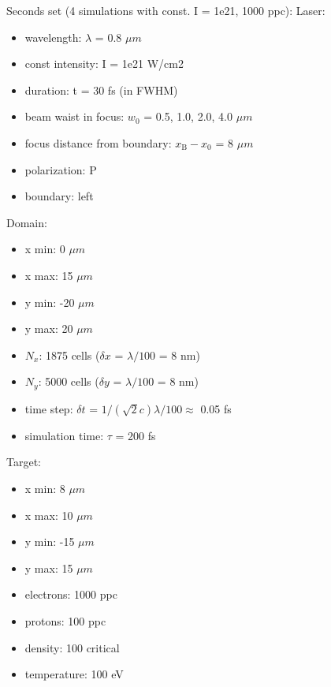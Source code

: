 \noindent
Seconds set (4 simulations with const. I = 1e21, 1000 ppc):
\noindent
Laser:
\begin{itemize}
	\item wavelength: $ \lambda $ = 0.8 $ \mu m $
	\item const intensity: I = 1e21 W/cm2
	\item duration: t = 30 fs (in FWHM)
	\item beam waist in focus: $ w_0 $ = 0.5, 1.0, 2.0, 4.0 $ \mu m $
	\item focus distance from boundary: $ x_\mathrm{B} - x_0 $ = 8 $ \mu m $
	\item polarization: P
	\item boundary: left 
\end{itemize}
Domain:
\begin{itemize}
	\item x min: 0 $ \mu m $
	\item x max: 15 $ \mu m $
	\item y min: -20 $ \mu m $
	\item y max: 20 $ \mu m $
	\item $ N_x $: 1875 cells ($ \delta x $ = $ \lambda/100 $ = 8 nm)
	\item $ N_y $: 5000 cells ($ \delta y $ = $ \lambda/100 $ = 8 nm)
	\item time step: $ \delta t $ = $ 1/(\sqrt{2} c) \lambda /100 \approx $ 0.05 fs 
	\item simulation time: $ \tau $ = 200 fs
\end{itemize}
Target:
\begin{itemize}
	\item x min: 8 $ \mu m $
	\item x max: 10 $ \mu m $
	\item y min: -15 $ \mu m $
	\item y max: 15 $ \mu m $
	\item electrons: 1000 ppc
	\item protons: 100 ppc
	\item density: 100 critical
	\item temperature: 100 eV
\end{itemize}

